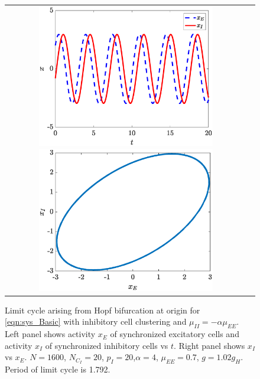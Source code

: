 \documentclass[reqno]{siamonline190516}
\begin{document}
\begin{figure}
    \centering
    \begin{tabular}{cc}
    \includegraphics[width=7.8cm]{images/limitcycleIC1.eps}
    \includegraphics[width=7.8cm]{images/limitcycleIC2.eps}
    \end{tabular}
    \caption{Limit cycle arising from Hopf bifurcation at origin for \cref{eqn:sys_Basic} with inhibitory cell clustering and $\mu_{II} = -\alpha \mu_{EE}$. Left panel shows activity $x_E$ of synchronized excitatory cells and activity $x_I$ of synchronized inhibitory cells vs $t$. Right panel shows $x_I$ vs $x_E$. $N=1600$, $N_{C_I} = 20$, $p_I = 20$,$\alpha = 4$, $\mu_{EE}= 0.7$, $g = 1.02 g_H$. Period of limit cycle is 1.792.} 
    \label{fig:limitcycleIC}
\end{figure}
\end{document}
